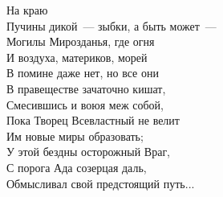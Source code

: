\documentclass[10pt]{book}
\begin{document}
\begin{center}
На краю \\
Пучины дикой~--- зыбки, а быть может~--- \\
Могилы Мирозданья, где огня\\
И воздуха, материков, морей\\
В помине даже нет, но все они\\
В правеществе зачаточно кишат,\\
Смесившись и воюя меж собой,\\
Пока Творец Всевластный не велит\\
Им новые миры образовать;\\
У этой бездны осторожный Враг,\\
С порога Ада созерцая даль,\\
Обмысливал свой предстоящий путь...
\end{center}

\tableofcontents\newpage

\renewcommand{\@oddhead}{\vbox{\hbox to \textwidth{{\raisebox{1.8mm}{\strut{\small\bfseries Кировская ЛМШ 2016, 7 класс}}\hfil\raisebox{1.8mm}{\strut\bfseries\thepage}}}\hrule}}
\renewcommand{\@evenhead}{\vbox{\hbox to \textwidth{{\raisebox{1.8mm}{\strut\bfseries\thepage}\hfil\raisebox{1.8mm}{\strut{\small\bfseries Кировская ЛМШ 2016, 7 класс}}}}\hrule}}
\end{document}
